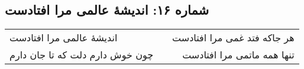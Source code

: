 \begin{center}
\section*{شماره ۱۶: اندیشۀ عالمی مرا افتادست}
\label{sec:016}
\begin{longtable}{l p{0.5cm} r}
اندیشهٔ عالمی مرا افتادست
&&
هر جاکه فتد غمی مرا افتادست
\\
چون خوش دارم دلت که تا جان دارم
&&
تنها همه ماتمی مرا افتادست
\\
\end{longtable}
\end{center}
